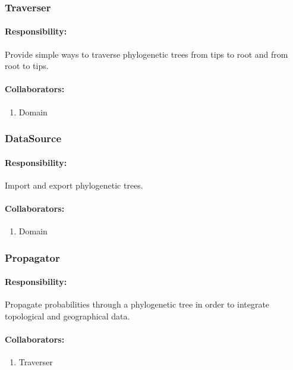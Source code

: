 \documentclass[a4paper,10pt]{article}
\begin{document}
\subsubsection{Traverser}

\paragraph{Responsibility:} Provide simple ways to traverse phylogenetic trees from tips to root and from root to tips.
\paragraph{Collaborators:}
      \begin{enumerate}
       \item Domain
      \end{enumerate}

\subsubsection{DataSource}

\paragraph{Responsibility:} Import and export phylogenetic trees.
\paragraph{Collaborators:}
      \begin{enumerate}
       \item Domain
      \end{enumerate}

\subsubsection{Propagator}

\paragraph{Responsibility:} Propagate probabilities through a phylogenetic tree in order to integrate topological and geographical data.
\paragraph{Collaborators:}
      \begin{enumerate}
       \item Traverser
      \end{enumerate}
\end{document}
